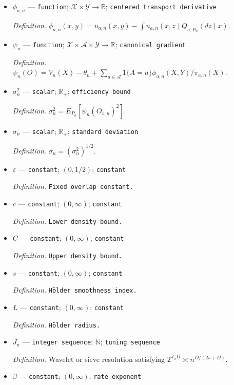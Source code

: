 \documentclass{article}
\begin{document}
\begin{itemize}
  \item \(\phi_{a,n}\) --- \texttt{function}; \(\mathcal X\times\mathcal Y\to\mathbb R\); \texttt{centered transport derivative}
  \par\smallskip\noindent\emph{Definition.} \(\phi_{a,n}(x,y)=u_{a,n}(x,y)-\int u_{a,n}(x,z)Q_{a,P_n}(dz\mid x)\).
  \item \(\psi_n\) --- \texttt{function}; \(\mathcal X\times\mathcal A\times\mathcal Y\to\mathbb R\); \texttt{canonical gradient}
  \par\smallskip\noindent\emph{Definition.} \(\psi_n(O)=V_n(X)-\theta_n+\sum_{a\in\mathcal A}1\{A=a\}\phi_{a,n}(X,Y)/\pi_{a,n}(X)\).
  \item \(\sigma_n^2\) --- \texttt{scalar}; \(\mathbb R_+\); \texttt{efficiency bound}
  \par\smallskip\noindent\emph{Definition.} \(\sigma_n^2=E_{P_n}[\psi_n(O_{1,n})^2]\).
  \item \(\sigma_n\) --- \texttt{scalar}; \(\mathbb R_+\); \texttt{standard deviation}
  \par\smallskip\noindent\emph{Definition.} \(\sigma_n=(\sigma_n^2)^{1/2}\).
  \item \(\varepsilon\) --- \texttt{constant}; \((0,1/2)\); \texttt{constant}
  \par\smallskip\noindent\emph{Definition.} \texttt{Fixed overlap constant.}
  \item \(c\) --- \texttt{constant}; \((0,\infty)\); \texttt{constant}
  \par\smallskip\noindent\emph{Definition.} \texttt{Lower density bound.}
  \item \(C\) --- \texttt{constant}; \((0,\infty)\); \texttt{constant}
  \par\smallskip\noindent\emph{Definition.} \texttt{Upper density bound.}
  \item \(s\) --- \texttt{constant}; \((0,\infty)\); \texttt{constant}
  \par\smallskip\noindent\emph{Definition.} \texttt{Hölder smoothness index.}
  \item \(L\) --- \texttt{constant}; \((0,\infty)\); \texttt{constant}
  \par\smallskip\noindent\emph{Definition.} \texttt{Hölder radius.}
  \item \(J_n\) --- \texttt{integer sequence}; \(\mathbb N\); \texttt{tuning sequence}
  \par\smallskip\noindent\emph{Definition.} Wavelet or sieve resolution satisfying \(2^{J_nD}\asymp n^{D/(2s+D)}\).
  \item \(\beta\) --- \texttt{constant}; \((0,\infty)\); \texttt{rate exponent}

\end{itemize}
\end{document}
